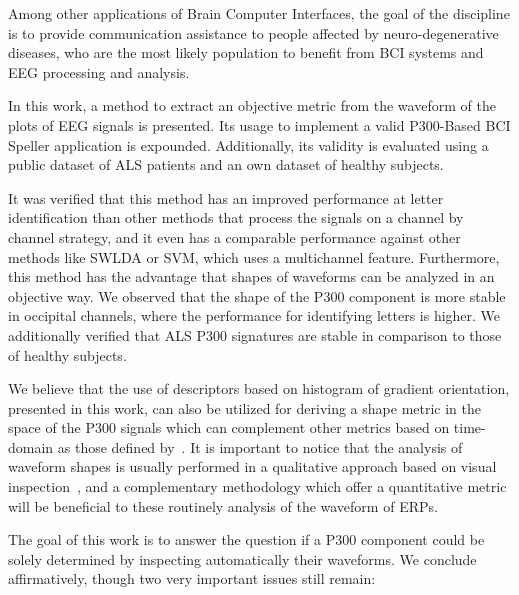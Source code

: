 \documentclass[utf8]{frontiersSCNS} %
\begin{document}
Among other applications of Brain Computer Interfaces, the goal of the discipline is to provide communication assistance to people affected by neuro-degenerative diseases, who are the most likely population to benefit from BCI systems and EEG processing and analysis.

In this work, a method to extract an objective metric from the waveform of the plots of EEG signals is presented.  Its usage to implement a valid P300-Based BCI Speller application is expounded.  Additionally, its validity is evaluated using a public dataset of ALS patients and an own dataset of healthy subjects. 


It was verified that this method has an improved performance at letter identification than other methods that process the signals on a channel by channel strategy, and it even has a comparable performance against other methods like SWLDA or SVM, which uses a multichannel feature.
Furthermore, this method has the advantage that shapes of waveforms can be analyzed in an objective way.  We observed that the shape of the P300 component is more stable in occipital channels, where the performance for identifying letters is higher.   We additionally verified that ALS P300 signatures are stable in comparison to those of healthy subjects.


We believe that the use of descriptors based on histogram of gradient orientation, presented in this work, can also be utilized for deriving a shape metric in the space of the P300 signals which can complement other metrics based on time-domain as those defined by~\cite{Mak2012}. It is important to notice that the analysis of waveform shapes is usually performed in a qualitative approach based on visual inspection~\citep{SellersandEmanuelDonchin2006}, and a complementary methodology which offer a quantitative metric will be beneficial to these routinely analysis of the waveform of ERPs.


The goal of this work is to answer the question if a P300 component could be solely determined by inspecting automatically their waveforms.  We conclude affirmatively, though two very important issues still remain:
\end{document}
